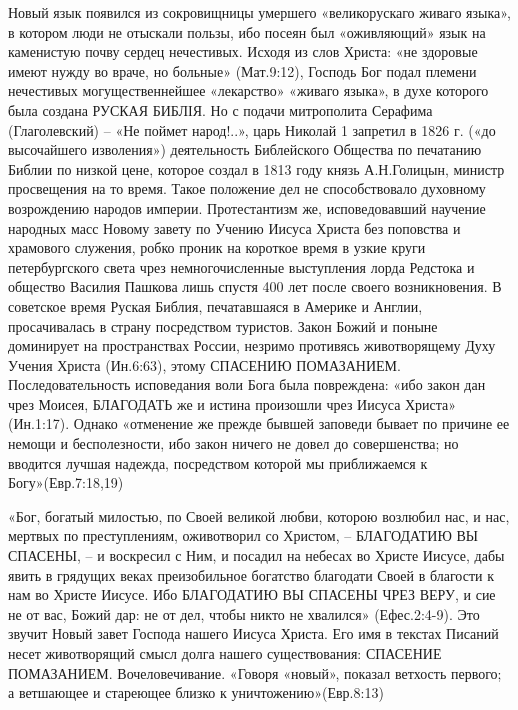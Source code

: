      Новый язык появился из сокровищницы умершего «великорускаго живаго языка», в котором люди не отыскали пользы, ибо посеян был «оживляющий» язык на каменистую почву сердец нечестивых. Исходя из слов Христа: «не здоровые имеют нужду во враче, но больные» (Мат.9:12), Господь Бог подал племени нечестивых могущественнейшее «лекарство» «живаго языка», в духе которого была создана  РУСКАЯ  БИБЛІЯ. Но с подачи митрополита Серафима (Глаголевский) – «Не поймет народ!..», царь Николай 1 запретил в 1826 г. («до высочайшего изволения») деятельность Библейского Общества по печатанию Библии по низкой цене, которое создал в 1813 году князь А.Н.Голицын, министр просвещения на то время. Такое положение дел не способствовало духовному возрождению народов империи.
Протестантизм же, исповедовавший научение народных масс Новому завету по Учению Иисуса Христа без поповства и храмового служения, робко проник на короткое время в узкие круги петербургского света чрез немногочисленные выступления лорда Редстока и общество Василия Пашкова лишь спустя 400 лет после своего возникновения. В советское время Руская Библия, печатавшаяся в Америке и Англии, просачивалась в страну посредством туристов. Закон Божий и поныне доминирует на пространствах России, незримо противясь животворящему Духу Учения Христа (Ин.6:63), этому  СПАСЕНИЮ  ПОМАЗАНИЕМ. Последовательность исповедания воли Бога была повреждена: «ибо закон дан чрез Моисея,
БЛАГОДАТЬ же и истина произошли чрез Иисуса Христа» (Ин.1:17).  Однако «отменение же прежде бывшей заповеди бывает по причине ее немощи и бесполезности, ибо закон ничего не довел до совершенства; но вводится лучшая надежда, посредством которой мы приближаемся к Богу»(Евр.7:18,19)

    «Бог, богатый милостью, по Своей великой любви, которою возлюбил нас, и нас, мертвых по преступлениям, оживотворил со Христом, – БЛАГОДАТИЮ ВЫ СПАСЕНЫ, – и воскресил с Ним, и посадил на небесах во Христе Иисусе, дабы явить в грядущих веках преизобильное богатство благодати Своей в благости к нам во Христе Иисусе. Ибо  БЛАГОДАТИЮ  ВЫ  СПАСЕНЫ  ЧРЕЗ  ВЕРУ,  и сие не от вас, Божий дар:  не от дел, чтобы никто не хвалился» (Ефес.2:4-9).
              Это звучит Новый завет Господа нашего Иисуса Христа.    Его имя в текстах Писаний несет животворящий смысл долга нашего существования:  СПАСЕНИЕ  ПОМАЗАНИЕМ.  Вочеловечивание.
«Говоря «новый», показал ветхость первого; а ветшающее и стареющее близко к уничтожению»(Евр.8:13)

